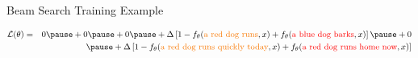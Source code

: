 \begin{frame}[fragile]{Beam Search Training Example}
\begin{center}
\begin{tikzpicture}[transform canvas = {scale=0.8}]

\end{tikzpicture}
  \end{center}
  \air
  \air
  \air

  \begin{eqnarray*}
 {\cal L}(\theta) &=& 0 \pause + 0 \pause +  0 \pause +  \Delta \left[1 - f_{\theta}( \textcolor{gold}{\text{a red dog runs}}, x) +  f_{\theta}(\textcolor{red}{\text{a blue dog barks}}, x) \right] \pause + 0 \\
            & &   \pause + \Delta \left[1 - f_{\theta}( \textcolor{gold}{\text{a red dog runs quickly today}}, x) +  f_{\theta}(\textcolor{red}{\text{a red dog runs home now}}, x) \right]
  \end{eqnarray*}

\end{frame}

